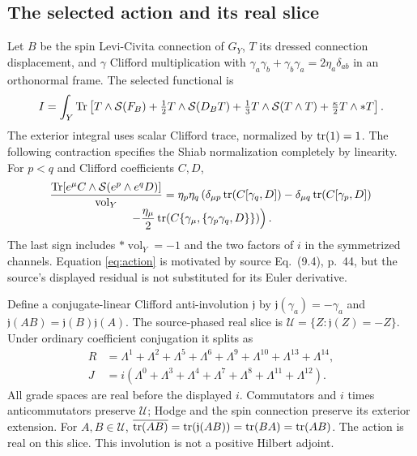 \subsection{The selected action and its real slice}
Let $B$ be the spin Levi-Civita connection of $G_Y$, $T$ its dressed
connection displacement, and $\gamma$ Clifford multiplication with
$\gamma_a\gamma_b+\gamma_b\gamma_a=2\eta_a\delta_{ab}$ in an
orthonormal frame. The selected functional is
\begin{equation}
 I=\int_Y\operatorname{Tr}\left[
 T\wedge\mathcal S(F_B)+\tfrac12T\wedge\mathcal S(D_BT)
 +\tfrac13T\wedge\mathcal S(T\wedge T)
 +\tfrac\kappa2T\wedge *T\right].\label{eq:action}
\end{equation}
The exterior integral uses scalar Clifford trace, normalized by
$\operatorname{tr}(1)=1$. The following contraction specifies the Shiab normalization
completely by linearity. For $p<q$ and Clifford coefficients $C,D$,
\begin{align}
 &\frac{\operatorname{Tr}[e^\mu C\wedge\mathcal S(e^p\wedge e^qD)]}{\operatorname{vol}_Y}
   =\eta_p\eta_q\left(\delta_{\mu p}\operatorname{tr}(C[\gamma_q,D])
       -\delta_{\mu q}\operatorname{tr}(C[\gamma_p,D])\right.\nonumber\\[-0.3em]
 &\hspace{7em}\left.
       -\frac{\eta_\mu}{2}\operatorname{tr}(C\{\gamma_\mu,\{\gamma_p\gamma_q,D\}\})
       \right).\label{eq:shiab}
\end{align}
The last sign includes $*\operatorname{vol}_Y=-1$ and the two factors
of $i$ in the symmetrized channels. Equation \eqref{eq:action} is
motivated by source Eq.~(9.4), p.~44, but the source's displayed residual
is not substituted for its Euler derivative.

Define a conjugate-linear Clifford anti-involution $\mathfrak j$ by
$\mathfrak j(\gamma_a)=-\gamma_a$ and
$\mathfrak j(AB)=\mathfrak j(B)\mathfrak j(A)$. The source-phased real
slice is $\mathcal U=\{Z:\mathfrak j(Z)=-Z\}$. Under ordinary coefficient
conjugation it splits as
\begin{align}
 R&=\Lambda^1+\Lambda^2+\Lambda^5+\Lambda^6
       +\Lambda^9+\Lambda^{10}+\Lambda^{13}+\Lambda^{14},\nonumber\\
 J&=i(\Lambda^0+\Lambda^3+\Lambda^4+\Lambda^7
                  +\Lambda^8+\Lambda^{11}+\Lambda^{12}).\label{eq:packets}
\end{align}
All grade spaces are real before the displayed $i$. Commutators and
$i$ times anticommutators preserve $\mathcal U$; Hodge and the spin
connection preserve its exterior extension. For $A,B\in\mathcal U$,
$\overline{\operatorname{tr}(AB)}=\operatorname{tr}(\mathfrak j(AB))=\operatorname{tr}(BA)=\operatorname{tr}(AB)$.
The action is real on this slice. This involution is not a positive
Hilbert adjoint.

